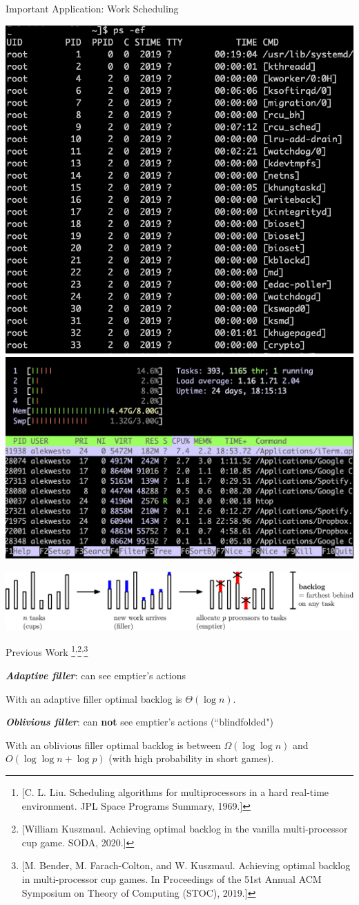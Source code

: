 \documentclass[xcolor=x11names, svgnames, rgb]{beamer}
\newcommand{\defn}[1]       {{\textit{\textbf{\boldmath #1}}}}
\begin{document}
\begin{frame}[t]{Important Application: Work Scheduling}
  \begin{center}
  \includegraphics[width=0.36\linewidth]{ps-ef/ps-ef.png}
  \includegraphics[width=0.62\linewidth]{ps-ef/work_scheduling.png}
  \end{center}
  \includegraphics[width=\linewidth]{workScheduling/workScheduling.eps}
\end{frame}

\begin{frame}[t]{Previous Work \footnote{[C. L.
  Liu. Scheduling algorithms for multiprocessors
  in a hard real-time environment. JPL Space
  Programs Summary,
  1969.]}\textsuperscript{,}\footnote{[William
  Kuszmaul. Achieving optimal backlog in the
  vanilla multi-processor cup game. SODA,
  2020.]}\textsuperscript{,}\footnote{[M. Bender,
  M. Farach-Colton, and W. Kuszmaul. Achieving
  optimal backlog in multi-processor cup games. In
  Proceedings of the 51st Annual ACM Symposium on
  Theory of Computing (STOC), 2019.]}}

  \defn{Adaptive filler}: can see emptier's actions
  \begin{theorem}
    With an adaptive filler optimal backlog is
    $\Theta(\log n)$.
  \end{theorem}

  \defn{Oblivious filler}: can \textbf{not} see emptier's actions (``blindfolded")
  \begin{theorem}
    With an oblivious filler optimal backlog is between $\Omega(\log \log n)$ and $O(\log\log n + \log p)$ (with high probability in short games).
  \end{theorem}

\end{frame}
\end{document}
